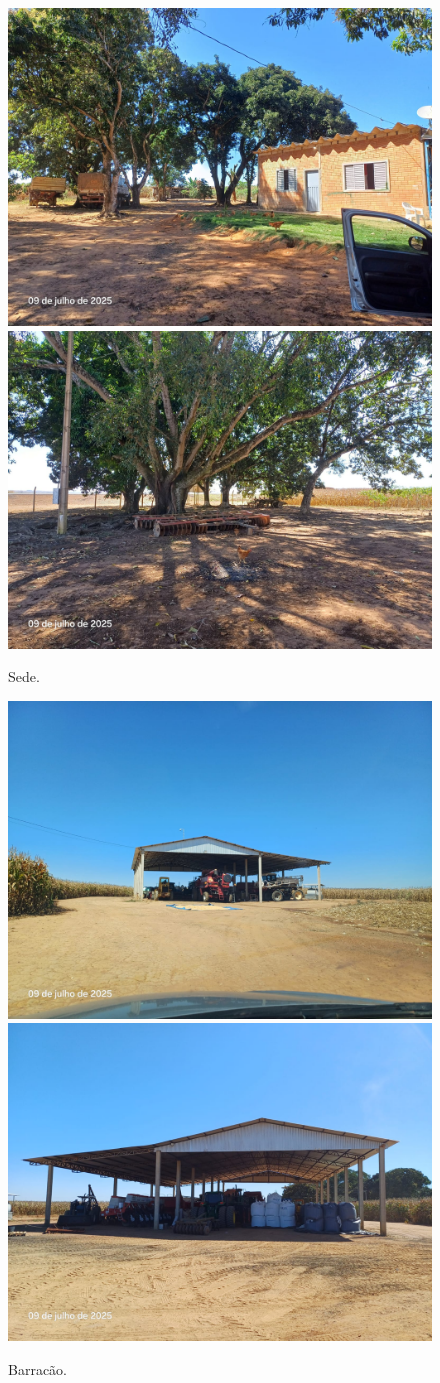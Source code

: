 \documentclass[
  10pt,
  a4paper]{article}
\begin{document}
\begin{figure}[H]

{\centering \includegraphics[width=0.49\linewidth]{./refs/Fotos/35} \includegraphics[width=0.49\linewidth]{./refs/Fotos/36} 

}

\caption{Sede.}\label{fig:Sede}
\end{figure}

\begin{figure}[H]

{\centering \includegraphics[width=0.49\linewidth]{./refs/Fotos/30} \includegraphics[width=0.49\linewidth]{./refs/Fotos/29} 

}

\caption{Barracão.}\label{fig:Barracao}
\end{figure}
\end{document}
